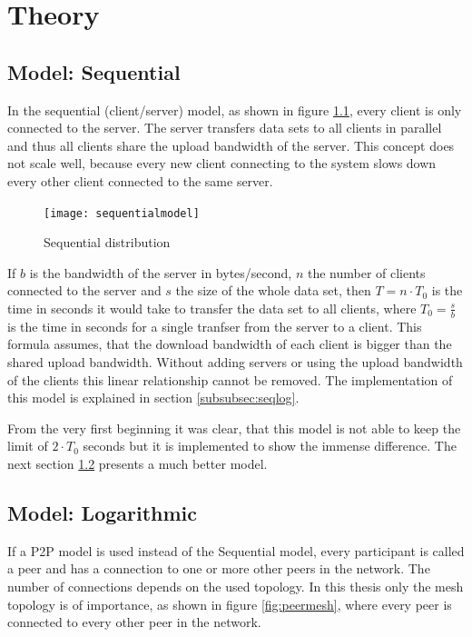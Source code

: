 \chapter{Theory}
\label{ch:theory}

\section{Model: Sequential}
\label{sec:sequentialmodel}
In the sequential (client/server) model, as shown in figure \ref{fig:sequentialmodel}, every client is only connected to the server. The server transfers data sets to all clients in parallel and thus all clients share the upload bandwidth of the server. This concept does not scale well, because every new client connecting to the system slows down every other client connected to the same server. 

\begin{figure}[H]
\centering
\texttt{[image: sequentialmodel]}
\caption{Sequential distribution}
\label{fig:sequentialmodel}
\end{figure}

If $b$ is the bandwidth of the server in bytes/second, $n$ the number of clients connected to the server and $s$ the size of the whole data set, then $T= n \cdot T_0$ is the time in seconds it would take to transfer the data set to all clients, where $T_0=\frac{s}{b}$ is the time in seconds for a single tranfser from the server to a client. This formula assumes, that the download bandwidth of each client is bigger than the shared upload bandwidth. Without adding servers or using the upload bandwidth of the clients this linear relationship cannot be removed. The implementation of this model is explained in section \ref{subsubsec:seqlog}.

From the very first beginning it was clear, that this model is not able to keep the limit of $2 \cdot T_0$ seconds but it is implemented to show the immense difference. The next section \ref{sec:logarithmicmodel} presents a much better model.

\pagebreak
\section{Model: Logarithmic}
\label{sec:logarithmicmodel}
If a P2P model is used instead of the Sequential model, every participant is called a peer and has a connection to one or more other peers in the network. The number of connections depends on the used topology. In this thesis only the mesh topology is of importance, as shown in figure \ref{fig:peermesh}, where every peer is connected to every other peer in the network.

